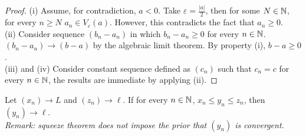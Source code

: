\documentclass[11pt]{article}
\begin{document}
	\begin{proof}
		(i) Assume, for contradiction, $a < 0$. Take $\varepsilon = \frac{|a|}{2}$, then for some $N \in \mathbb{N}$, for every $n \geq N$ $a_n \in V_\varepsilon(a)$. However, this contradicts the fact that $a_n \geq 0$. \\
		(ii) Consider sequence $(b_n - a_n)$ in which $b_n - a_n \geq 0$ for every $n \in \mathbb{N}$. $(b_n - a_n) \to (b - a)$ by the algebraic limit theorem. By property (i), $b - a \geq 0$. \\
		(iii) and (iv) Consider constant sequence defined as $(c_n)$ such that $c_n = c$ for every $n \in \mathbb{N}$, the results are immediate by applying (ii).
	\end{proof}
	
	\begin{theorem}
		Let $(x_n) \to L$ and $(z_n) \to \ell$. If for every $n \in \mathbb{N}$, $x_n \leq y_n \leq z_n$, then $(y_n) \to \ell$. \\
		\emph{Remark: squeeze theorem does not impose the prior that $(y_n)$ is convergent.}
	\end{theorem}
	
\end{document}
